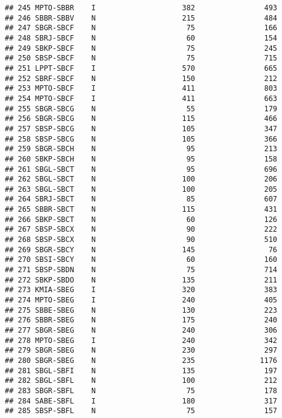 \documentclass[
]{article}
\begin{document}
\begin{verbatim}
## 245 MPTO-SBBR    I                    382                493
## 246 SBBR-SBBV    N                    215                484
## 247 SBGR-SBCF    N                     75                166
## 248 SBRJ-SBCF    N                     60                154
## 249 SBKP-SBCF    N                     75                245
## 250 SBSP-SBCF    N                     75                715
## 251 LPPT-SBCF    I                    570                665
## 252 SBRF-SBCF    N                    150                212
## 253 MPTO-SBCF    I                    411                803
## 254 MPTO-SBCF    I                    411                663
## 255 SBGR-SBCG    N                     55                179
## 256 SBGR-SBCG    N                    115                466
## 257 SBSP-SBCG    N                    105                347
## 258 SBSP-SBCG    N                    105                366
## 259 SBGR-SBCH    N                     95                213
## 260 SBKP-SBCH    N                     95                158
## 261 SBGL-SBCT    N                     95                696
## 262 SBGL-SBCT    N                    100                206
## 263 SBGL-SBCT    N                    100                205
## 264 SBRJ-SBCT    N                     85                607
## 265 SBBR-SBCT    N                    115                431
## 266 SBKP-SBCT    N                     60                126
## 267 SBSP-SBCX    N                     90                222
## 268 SBSP-SBCX    N                     90                510
## 269 SBGR-SBCY    N                    145                 76
## 270 SBSI-SBCY    N                     60                160
## 271 SBSP-SBDN    N                     75                714
## 272 SBKP-SBDO    N                    135                211
## 273 KMIA-SBEG    I                    320                383
## 274 MPTO-SBEG    I                    240                405
## 275 SBBE-SBEG    N                    130                223
## 276 SBBR-SBEG    N                    175                240
## 277 SBGR-SBEG    N                    240                306
## 278 MPTO-SBEG    I                    240                342
## 279 SBGR-SBEG    N                    230                297
## 280 SBGR-SBEG    N                    235               1176
## 281 SBGL-SBFI    N                    135                197
## 282 SBGL-SBFL    N                    100                212
## 283 SBGR-SBFL    N                     75                178
## 284 SABE-SBFL    I                    180                317
## 285 SBSP-SBFL    N                     75                157

\end{verbatim}
\end{document}
